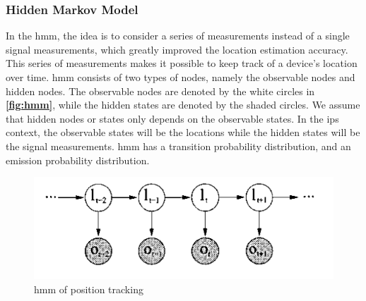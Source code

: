 \subsubsection{Hidden Markov Model}
In the \gls{hmm}, the idea is to consider a series of measurements instead of a single signal measurements, which greatly improved the location estimation accuracy. This series of measurements makes it possible to keep track of a device's location over time. \gls{hmm} consists of two types of nodes, namely the observable nodes and hidden nodes. The observable nodes are denoted by the white circles in \textbf{\autoref{fig:hmm}}, while the hidden states are denoted by the shaded circles. We assume that hidden nodes or states only depends on the observable states. In the \gls{ips} context, the observable states will be the locations while the hidden states will be the signal measurements. \gls{hmm} has a transition probability distribution, and an emission probability distribution. 
\begin{figure}[h]
    \centering
    \includegraphics[scale=1.6]{Images/ProblemAnalysis/hmm_pe.PNG}
    \caption{\gls{hmm} of position tracking}
    \label{fig:hmm}
\end{figure}
